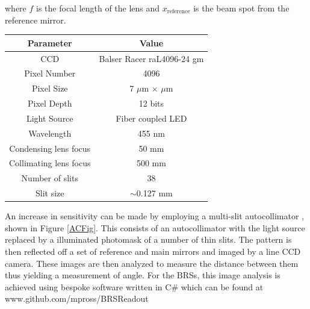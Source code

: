 \documentclass [12pt, proquest]{uwthesis}[2019]
\begin{document}
where $f$ is the focal length of the lens and $x_\text{reference}$ is the beam spot from the reference mirror.

\begin{center}
\begin{tabular}{| c | c |}
\hline
Parameter & Value\\
\hline \hline
CCD & Balser Racer raL4096-24 gm\\
Pixel Number & 4096\\
Pixel Size & 7 $\mu$m $\times$  $\mu$m\\
Pixel Depth & 12 bits\\
Light Source & Fiber coupled LED\\
Wavelength & 455 nm\\
Condensing lens focus & 50 mm\\
Collimating lens focus & 500 mm\\
Number of slits & 38\\
Slit size & $\sim$0.127 mm\\
\hline
\end{tabular}
\label{ACTable}
\end{center}

An increase in sensitivity can be made by employing a multi-slit autocollimator \cite{MSA}, shown in Figure \ref{ACFig}. This consists of an autocollimator with the light source replaced by a illuminated photomask of a number of thin slits. The pattern is then reflected off a set of reference and main mirrors and imaged by a line CCD camera. These images are then analyzed to measure the distance between them thus yielding a measurement of angle. For the BRSs, this image analysis is achieved using bespoke software written in C\# which can be found at www.github.com/mpross/BRSReadout
\end{document}
